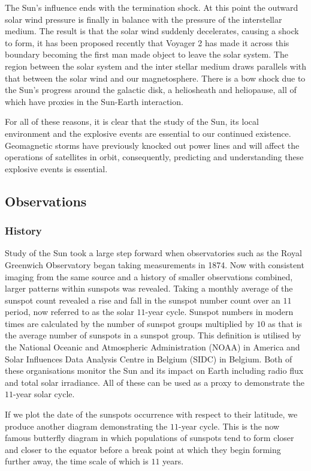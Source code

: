 The Sun's influence ends with the termination shock.
At this point the outward solar wind pressure is finally in balance with the pressure of the interstellar medium.
The result is that the solar wind suddenly decelerates, causing a shock to form, it has been proposed recently that Voyager 2 has made it across this boundary becoming the first man made object to leave the solar system.
The region between the solar system and the inter stellar medium draws parallels with that between the solar wind and our magnetosphere.
There is a bow shock due to the Sun's progress around the galactic disk, a heliosheath and heliopause, all of which have proxies in the Sun-Earth interaction.

For all of these reasons, it is clear that the study of the Sun, its local environment and the explosive events are essential to our continued existence.
Geomagnetic storms have previously knocked out power lines and will affect the operations of satellites in orbit, consequently, predicting and understanding these explosive events is essential.

\subsection{Observations}

\subsubsection{History}

Study of the Sun took a large step forward when observatories such as the Royal Greenwich Observatory began taking measurements in 1874.
Now with consistent imaging from the same source and a history of smaller observations combined, larger patterns within sunspots was revealed.
Taking a monthly average of the sunspot count revealed a rise and fall in the sunspot number count over an $11$ period, now referred to as the solar $11$-year cycle.
Sunspot numbers in modern times are calculated by the number of sunspot groups multiplied by $10$ as that is the average number of sunspots in a sunspot group.
This definition is utilised by the National Oceanic and Atmospheric Administration (NOAA) in America and Solar Influences Data Analysis Centre in Belgium (SIDC) in Belgium.
Both of these organisations monitor the Sun and its impact on Earth including radio flux and total solar irradiance.
All of these can be used as a proxy to demonstrate the $11$-year solar cycle.

If we plot the date of the sunspots occurrence with respect to their latitude, we produce another diagram demonstrating the $11$-year cycle.
This is the now famous butterfly diagram in which populations of sunspots tend to form closer and closer to the equator before a break point at which they begin forming further away, the time scale of which is $11$ years.

